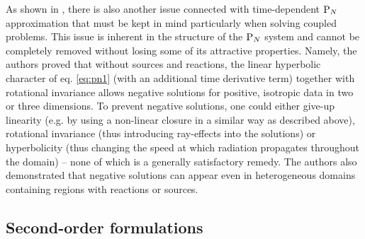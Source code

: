 As shown in \cite{McClarren4}, there is also another issue connected with time-dependent $\text{P}_{N}$ approximation that must
be kept in mind particularly when solving coupled problems. This issue is inherent in the structure of the $\text{P}_{N}$ system
and cannot be completely removed without losing some of its attractive properties. Namely, the authors proved that
without sources and reactions, the linear hyperbolic character of eq. \eqref{eq:pn1} (with an additional time derivative
term) together with rotational invariance allows negative solutions for positive, isotropic data in two or three
dimensions. To prevent negative solutions, one could either give-up linearity (e.g. by using a non-linear closure in a
similar way as described above), rotational invariance (thus introducing ray-effects into the solutions) or
hyperbolicity (thus changing the speed at which radiation propagates throughout the domain) -- none of which is a
generally satisfactory remedy. The authors also demonstrated that negative solutions can appear even in heterogeneous
domains containing regions with reactions or sources.

\subsection{Second-order formulations}\label{sec:second-order}

